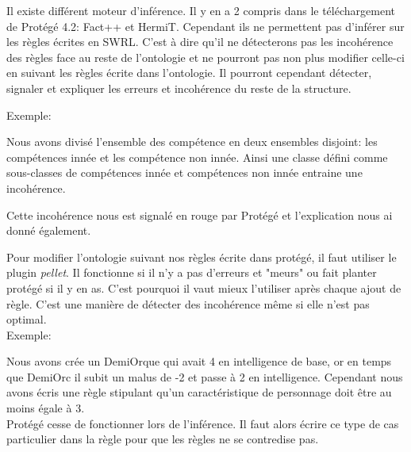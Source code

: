 \par Il existe différent moteur d'inférence. Il y en a 2 compris dans le téléchargement de Protégé 4.2: Fact++ et HermiT. Cependant ils ne permettent pas d'inférer sur les règles écrites en SWRL. C'est à dire qu'il ne détecterons pas les incohérence des règles face au reste de l'ontologie et ne pourront pas non plus modifier celle-ci en suivant les règles écrite dans l'ontologie. Il pourront cependant détecter, signaler et expliquer les erreurs et incohérence du reste de la structure.

Exemple:
\begin{minipage}{0.9\textwidth}
  
  \par Nous avons divisé l'ensemble des compétence en deux ensembles disjoint: les compétences innée et les compétence non innée. Ainsi une classe défini comme sous-classes de compétences innée et compétences non innée entraine une incohérence. 
  \par Cette incohérence nous est signalé en rouge par Protégé et l'explication nous ai donné également.
\end{minipage}



\par Pour modifier l'ontologie suivant nos règles écrite dans protégé, il faut utiliser le plugin \emph{pellet}. Il fonctionne si il n'y a pas d'erreurs et "meurs" ou fait planter protégé si il y en as. C'est pourquoi il vaut mieux l'utiliser après chaque ajout de règle. C'est une manière de détecter des incohérence même si elle n'est pas optimal. \\

Exemple: 
\begin{minipage}{0.9\textwidth}
  
  Nous avons crée un DemiOrque qui avait 4 en intelligence de base, or en temps que DemiOrc il subit un malus de -2 et passe à 2 en intelligence. Cependant nous avons écris une règle stipulant qu'un caractéristique de personnage doit être au moins égale à 3.
  \\Protégé cesse de fonctionner lors de l'inférence. Il faut alors écrire ce type de cas particulier dans la règle pour que les règles ne se contredise pas.
  
\end{minipage}
